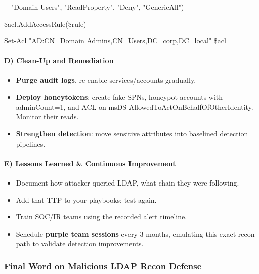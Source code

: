 {{  "Domain Users", "ReadProperty", "Deny", "GenericAll")

\$acl.AddAccessRule(\$rule)

Set-Acl "AD:CN=Domain Admins,CN=Users,DC=corp,DC=local" \$acl

\paragraph{\textbf{   D) Clean-Up and Remediation}}

\begin{itemize}
    \item \textbf{Purge audit logs}, re-enable services/accounts gradually.

    \item \textbf{Deploy honeytokens}: create fake SPNs, honeypot accounts with adminCount=1, and ACL on msDS-AllowedToActOnBehalfOfOtherIdentity. Monitor their reads.

    \item \textbf{Strengthen detection}: move sensitive attributes into baselined detection pipelines.

\end{itemize}

\paragraph{\textbf{   E) Lessons Learned \& Continuous Improvement}}

\begin{itemize}
    \item Document how attacker queried LDAP, what chain they were following.

    \item Add that TTP to your playbooks; test again.

    \item Train SOC/IR teams using the recorded alert timeline.

    \item Schedule \textbf{purple team sessions} every 3 months, emulating this exact recon path to validate detection improvements.

\end{itemize}

\subsubsection{\textbf{Final Word on Malicious LDAP Recon Defense}}

}}
